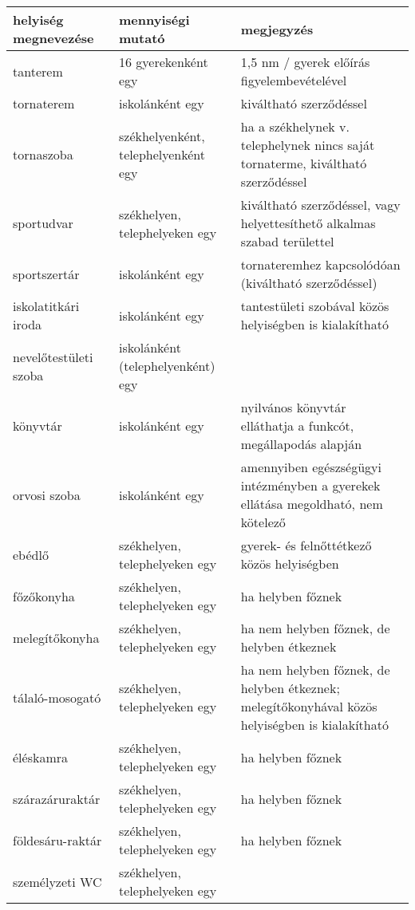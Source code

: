 \begin{longtable}{@{}p{4cm}|p{4cm}|p{6cm}@{}}

    \textbf{helyiség megnevezése} & \textbf{mennyiségi mutató}
                                  & \textbf{megjegyzés}
    \\ \hline
    tanterem                      & 16 gyerekenként egy                 &
    1,5 nm /
    gyerek előírás figyelembevételével
    \\ \hline
    tornaterem                    & iskolánként egy                     &
    kiváltható
    szerződéssel
    \\ \hline
    tornaszoba                    & székhelyenként, telephelyenként egy &
    ha a
    székhelynek v. telephelynek nincs saját tornaterme, kiváltható szerződéssel
    \\ \hline
    sportudvar                    & székhelyen, telephelyeken egy       &
    kiváltható
    szerződéssel, vagy helyettesíthető alkalmas szabad területtel
    \\ \hline
    sportszertár                  & iskolánként egy                     &
    tornateremhez kapcsolódóan (kiváltható szerződéssel)
    \\ \hline
    iskolatitkári iroda           & iskolánként egy                     &
    tantestületi szobával közös helyiségben  is kialakítható
    \\ \hline
    nevelőtestületi szoba         & iskolánként (telephelyenként) egy   &

    \\ \hline
    könyvtár                      & iskolánként egy                     &
    nyilvános
    könyvtár elláthatja a funkcót, megállapodás alapján
    \\ \hline
    orvosi szoba                  & iskolánként egy                     &
    amennyiben
    egészségügyi intézményben a gyerekek ellátása megoldható, nem kötelező
    \\
    \hline
    ebédlő                        & székhelyen, telephelyeken egy       &
    gyerek- és
    felnőttétkező közös helyiségben
    \\ \hline
    főzőkonyha                    & székhelyen, telephelyeken egy       &
    ha helyben
    főznek
    \\ \hline
    melegítőkonyha                & székhelyen, telephelyeken egy       &
    ha nem
    helyben főznek, de helyben étkeznek
    \\ \hline
    tálaló-mosogató               & székhelyen, telephelyeken egy       &
    ha nem
    helyben főznek, de helyben étkeznek; melegítőkonyhával közös helyiségben
    is
    kialakítható
    \\ \hline
    éléskamra                     & székhelyen, telephelyeken egy       &
    ha helyben
    főznek
    \\ \hline
    szárazáruraktár              & székhelyen, telephelyeken egy       &
    ha helyben
    főznek
    \\ \hline
    földesáru-raktár              & székhelyen, telephelyeken egy       &
    ha helyben
    főznek
    \\ \hline
    személyzeti WC                & székhelyen, telephelyeken egy       &


\end{longtable}
